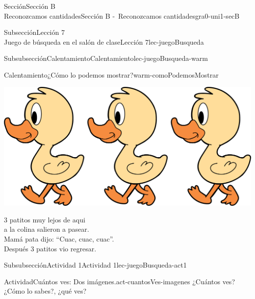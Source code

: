 \begin{sectionptx}{Sección}{{\Large Sección B\\}Reconozcamos cantidades}{}{Sección B -~Reconozcamos cantidades}{}{}{gra0-uni1-secB}
\begin{subsectionptx}{Subsección}{{\normalsize Lección 7\\[-0.05cm]}Juego de búsqueda en el salón de clase}{}{Lección 7}{}{}{lec-juegoBusqueda}
\begin{subsubsectionptx}{Subsubsección}{Calentamiento}{}{Calentamiento}{}{}{lec-juegoBusqueda-warm}
\begin{exploration}{Calentamiento}{¿Cómo lo podemos mostrar?}{warm-comoPodemosMostrar}
\begin{image}{0.0}{1}{0.0}{}
\includegraphics[max width=\linewidth, center]{external/png-source/3 ducks.png}
\end{image}%
%
\par
\vspace*{2ex}
3 patitos muy lejos de aqui\\
 a la colina salieron a pasear.\\
 Mamá pata dijo: “Cuac, cuac, cuac”.\\
 Después 3 patitos vio regresar.%
\end{exploration}%
\end{subsubsectionptx}
%
%
\typeout{************************************************}
\typeout{************************************************}
%
\clearpage
\begin{subsubsectionptx}{Subsubsección}{Actividad 1}{}{Actividad 1}{}{}{lec-juegoBusqueda-act1}
\begin{activity}{Actividad}{Cuántos ves: Dos imágenes.}{act-cuantosVes-imagenes}%
¿Cuántos ves?\\
 ¿Cómo lo sabes?, ¿qué ves?%
\begin{sidebyside}{2}{0}{0}{0}%
\begin{sbspanel}{0.5}%

\end{sbspanel}
\end{sidebyside}
\end{activity}
\end{subsubsectionptx}
\end{subsectionptx}
\end{sectionptx}
